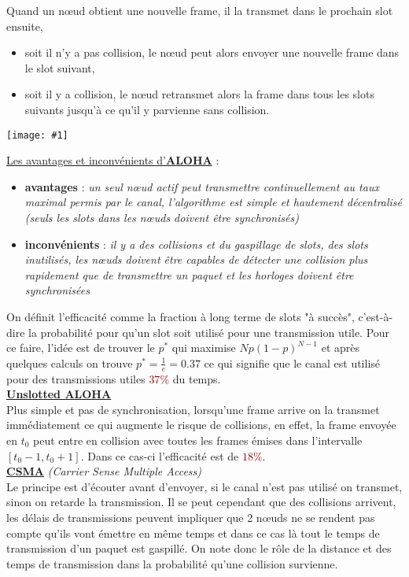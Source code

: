 \documentclass{article}
\newcommand{\red}[1]{\textcolor{darkred}{#1}}
\newcommand{\imgR}[2]{\begin{center}\texttt{[image: \#1]}\end{center}}
\newcommand{\bfp}[2]{\item \textbf{#1} : \textit{#2}}
\newcommand{\stitre}[1]{\noindent\textbf{\underline{#1}} \\}
\newcommand{\stitreD}[2]{\noindent\textbf{\underline{#1}} \textit{(#2)}\\}
\newcommand{\neuSP}{n\oe ud }
\newcommand{\neuSPs}{n\oe uds }
\begin{document}
\noindent Quand un \neuSP obtient une nouvelle frame, il la transmet dans le prochain slot ensuite,
\begin{itemize}
\item soit il n'y a pas collision, le \neuSP peut alors envoyer une nouvelle frame dans le slot suivant,
\item soit il y a collision, le \neuSP retransmet alors la frame dans tous les slots suivants jusqu'à ce qu'il y
parvienne sans collision.
\end{itemize}
\imgR{CN_111.png}{300}
\underline{Les avantages et inconvénients d'\textbf{ALOHA}} :
\begin{itemize}
\bfp{avantages}{un seul \neuSP actif peut transmettre continuellement au taux maximal permis par le canal, 
l'algorithme est simple et hautement décentralisé (seuls les slots dans les \neuSPs doivent être synchronisés)}
\bfp{inconvénients}{il y a des collisions et du gaspillage de slots, des slots inutilisés, les \neuSPs doivent 
être capables de détecter une collision plus rapidement que de transmettre un paquet et les horloges doivent être 
synchronisées}
\end{itemize}

\noindent On définit l'efficacité comme la fraction à long terme de slots "à succès", c'est-à-dire la probabilité
pour qu'un slot soit utilisé pour une transmission utile. Pour ce faire, l'idée est de trouver le $p^*$ qui 
maximise $Np(1-p)^{N-1}$ et après quelques calculs on trouve $p^* = \frac{1}{e} = 0.37$ ce qui signifie que le 
canal est utilisé pour des transmissions utiles \red{$37\%$} du temps. \\

\stitre{Unslotted ALOHA}

\noindent Plus simple et pas de synchronisation, lorsqu'une frame arrive on la transmet immédiatement ce qui 
augmente le risque de collisions, en effet, la frame envoyée en $t_0$ peut entre en collision avec toutes les 
frames émises dans l'intervalle $[t_0-1,t_0+1]$. Dans ce cas-ci l'efficacité est de \red{$18\%$}.\\

\stitreD{CSMA}{Carrier Sense Multiple Access}

\noindent Le principe est d'écouter avant d'envoyer, si le canal n'est pas utilisé on transmet, sinon on retarde 
la transmission. Il se peut cependant que des collisions arrivent, les délais de transmissions peuvent impliquer 
que 2 \neuSPs ne se rendent pas compte qu'ils vont émettre en même temps et dans ce cas là tout le temps de 
transmission d'un paquet est gaspillé. On note donc le rôle de la distance et des temps de transmission dans la
probabilité qu'une collision survienne.
\end{document}
